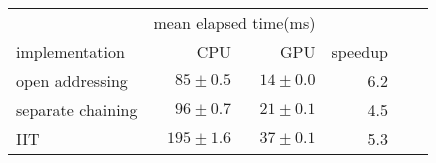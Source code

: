 \begin{tabular}{lrrrrr} 
\hline
  & \multicolumn{2}{c}{mean elapsed time(ms)} & \\ 
implementation & CPU & GPU  & speedup \\ 
\hline
     open addressing & $85 \pm 0.5$ & $14 \pm 0.0$ & 6.2 \\ 
   separate chaining & $96 \pm 0.7$ & $21 \pm 0.1$ & 4.5 \\ 
                 IIT & $195 \pm 1.6$ & $37 \pm 0.1$ & 5.3 \\ 
\hline
\end{tabular}
